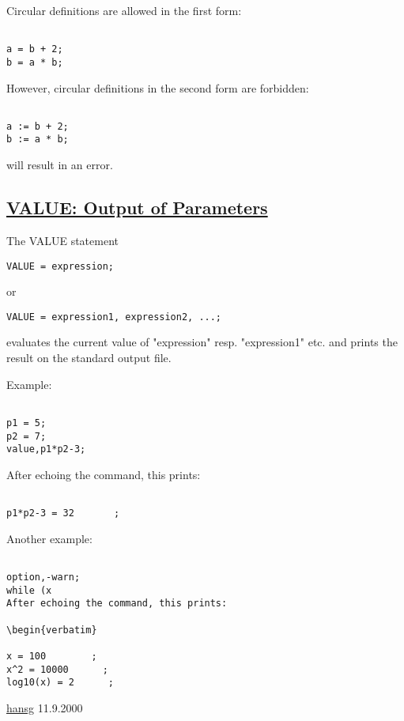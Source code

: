 Circular definitions are allowed in the first form:

\begin{verbatim}

a = b + 2;
b = a * b;
\end{verbatim}
However, circular definitions in the second form are forbidden:

\begin{verbatim}

a := b + 2;
b := a * b;
\end{verbatim}
will result in an error.


\subsection{\href{par_output}{VALUE: Output of Parameters}}
The VALUE statement

\begin{verbatim}
VALUE = expression;\end{verbatim}
or

\begin{verbatim}
VALUE = expression1, expression2, ...;\end{verbatim}
evaluates the current value of "expression" resp. "expression1" etc. and
prints the result on the standard output file.



Example:

\begin{verbatim}

p1 = 5;
p2 = 7;
value,p1*p2-3;
\end{verbatim}
After echoing the command, this prints:

\begin{verbatim}

p1*p2-3 = 32       ;
\end{verbatim}
Another example:

\begin{verbatim}

option,-warn;
while (x 
After echoing the command, this prints:

\begin{verbatim}

x = 100        ;       
x^2 = 10000      ;       
log10(x) = 2      ;            
\end{verbatim}

\href{http://www.cern.ch/Hans.Grote/hansg_sign.html}{hansg}
11.9.2000


